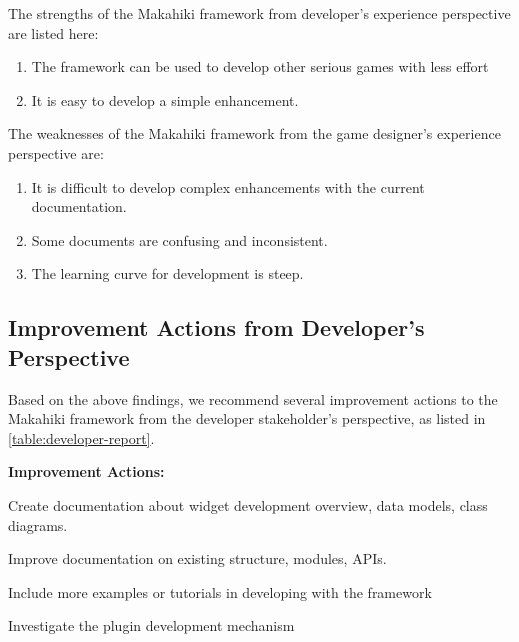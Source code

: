 The strengths of the Makahiki framework from developer's experience perspective are listed here:
    \begin{enumerate}
    \item The framework can be used to develop other serious games with less effort
    \item It is easy to develop a simple enhancement.
    \end{enumerate} 
The weaknesses of the Makahiki framework from the game designer's experience perspective are:
    \begin{enumerate}
    \item It is difficult to develop complex enhancements with the current documentation.
    \item Some documents are confusing and inconsistent.
    \item The learning curve for development is steep. 
    \end{enumerate} 

\subsection{Improvement Actions from Developer's Perspective}

Based on the above findings, we recommend several improvement actions to the Makahiki framework from the developer stakeholder's perspective, as listed in \autoref{table:developer-report}.

\begin{table}[t!]
\begin{shadebox}
{\bf Improvement Actions:}
\begin{compactenum}
\item Create documentation about widget development overview, data models, class diagrams.
\item Improve documentation on existing structure, modules, APIs.
\item Include more examples or tutorials in developing with the framework
\item Investigate the plugin development mechanism
\end{compactenum}
\end{shadebox}
\caption{SGSEAM Improvement Action Report from Developer Stakeholder's Perspective}
\label{table:developer-report}
\end{table}
